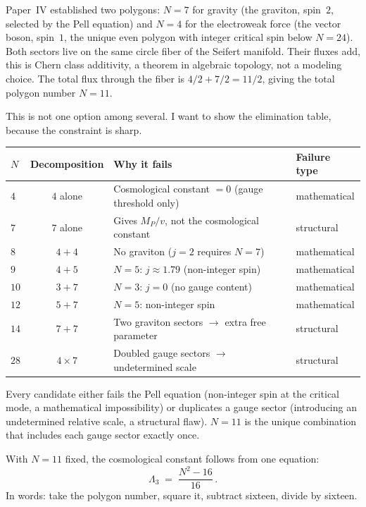 Paper~IV established two polygons: $N = 7$ for gravity (the
graviton, spin~$2$, selected by the Pell equation) and $N = 4$ for
the electroweak force (the vector boson, spin~$1$, the unique
even polygon with integer critical spin below $N = 24$). Both
sectors live on the same circle fiber of the Seifert manifold. Their
fluxes add, this is Chern class additivity, a theorem in algebraic
topology, not a modeling choice. The total flux through the fiber is
$4/2 + 7/2 = 11/2$, giving the total polygon number $N = 11$.

This is not one option among several. I want to show the
elimination table, because the constraint is sharp.

\begin{center}
\small
\begin{tabular}{lcll}
\toprule
$N$ & Decomposition & Why it fails & Failure type \\
\midrule
$4$  & $4$ alone      & Cosmological constant $= 0$ (gauge threshold only) & mathematical \\
$7$  & $7$ alone      & Gives $M_P/v$, not the cosmological constant & structural \\
$8$  & $4 + 4$        & No graviton ($j = 2$ requires $N = 7$) & mathematical \\
$9$  & $4 + 5$        & $N = 5$: $j \approx 1.79$ (non-integer spin) & mathematical \\
$10$ & $3 + 7$        & $N = 3$: $j = 0$ (no gauge content) & mathematical \\
$12$ & $5 + 7$        & $N = 5$: non-integer spin & mathematical \\
$14$ & $7 + 7$        & Two graviton sectors $\to$ extra free parameter & structural \\
$28$ & $4 \times 7$   & Doubled gauge sectors $\to$ undetermined scale & structural \\
\bottomrule
\end{tabular}
\end{center}

\noindent
Every candidate either fails the Pell equation (non-integer spin at
the critical mode, a mathematical impossibility) or duplicates a
gauge sector (introducing an undetermined relative scale, a
structural flaw). $N = 11$ is the unique combination that includes
each gauge sector exactly once.

With $N = 11$ fixed, the cosmological constant follows from one
equation:
\begin{equation}\label{eq:lambda-companion}
  \Lambda_3 \;=\; \frac{N^2 - 16}{16}\,.
\end{equation}
In words: take the polygon number, square it, subtract sixteen,
divide by sixteen.

